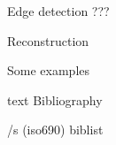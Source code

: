 \sec Edge detection ???

\sec Reconstruction

\sec Some examples












\bgroup
\let\_mtext\ignoreit
\nonum\chap Bibliography

\def\_opwarning#1{}
\usebib/s (iso690) biblist
\egroup

\bye

